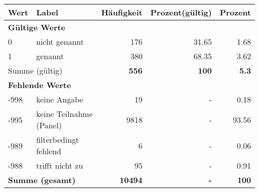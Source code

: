      \begin{longtable}{lXrrr}
     \toprule
     \textbf{Wert} & \textbf{Label} & \textbf{Häufigkeit} & \textbf{Prozent(gültig)} & \textbf{Prozent} \\
     \endhead
     \midrule
     \multicolumn{5}{l}{\textbf{Gültige Werte}}\\

     0 &
     \multicolumn{1}{X}{ nicht genannt   } &


       \num{176} &
       \num[round-mode=places,round-precision=2]{31,65} &
         \num[round-mode=places,round-precision=2]{1,68} \\

     1 &
     \multicolumn{1}{X}{ genannt   } &


       \num{380} &
       \num[round-mode=places,round-precision=2]{68,35} &
         \num[round-mode=places,round-precision=2]{3,62} \\
     \midrule
     \multicolumn{2}{l}{Summe (gültig)} &
       \textbf{\num{556}} &
     \textbf{100} &
       \textbf{\num[round-mode=places,round-precision=2]{5,3}} \\
     \multicolumn{5}{l}{\textbf{Fehlende Werte}}\\
       -998 &
       keine Angabe &
         \num{19} &
        - &
         \num[round-mode=places,round-precision=2]{0,18} \\
       -995 &
       keine Teilnahme (Panel) &
         \num{9818} &
        - &
         \num[round-mode=places,round-precision=2]{93,56} \\
       -989 &
       filterbedingt fehlend &
         \num{6} &
        - &
         \num[round-mode=places,round-precision=2]{0,06} \\
       -988 &
       trifft nicht zu &
         \num{95} &
        - &
         \num[round-mode=places,round-precision=2]{0,91} \\
     \midrule
     \multicolumn{2}{l}{\textbf{Summe (gesamt)}} &
          \textbf{\num{10494}} &
        \textbf{-} &
        \textbf{100} \\
     \bottomrule
     \end{longtable}
     
